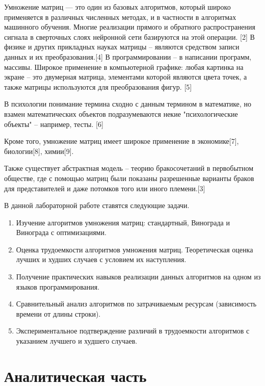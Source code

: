 \documentclass[a4paper,14pt]{article} %
\begin{document}
	Умножение матриц — это один из базовых алгоритмов, который широко применяется в различных численных методах, и в частности в алгоритмах машинного обучения. Многие реализации прямого и обратного распространения сигнала в сверточных слоях нейронной сети базируются на этой операции. [2] В физике и других прикладных науках матрицы – являются средством записи данных и их преобразования.[4] В программировании – в написании программ, массивы. Широкое применение в компьютерной графике: любая картинка на экране – это двумерная матрица, элементами которой являются цвета точек, а также матрицы используются для преобразования фигур. [5]
	
	В психологии понимание термина сходно с данным термином в математике, но взамен математических объектов подразумеваются некие "психологические объекты" – например, тесты. [6]
	
	Кроме того, умножение матриц имеет широкое применение в экономике[7], биологии[8], химии[9]. 
	
	Также существует абстрактная модель – теорию бракосочетаний в первобытном обществе, где с помощью матриц были показаны разрешенные варианты браков для представителей и даже потомков того или иного племени.[3]
	
	\hfill
	
	В данной лабораторной работе ставятся следующие задачи. 
        \begin{enumerate} 
		\item Изучение алгоритмов умножения матриц: стандартный, Винограда и Винограда с оптимизациями. 
		\item Оценка трудоемкости алгоритмов умножения матриц. Теоретическая оценка лучших и худших случаев с условием их наступления. 
		\item Получение практических навыков реализации данных алгоритмов на одном из языков программирования. 
		\item Сравнительный анализ алгоритмов по затрачиваемым ресурсам (зависимость времени от длины строки). 
		\item Экспериментальное подтверждение различий в трудоемкости алгоритмов с указанием лучшего и худшего случаев. 
	\end{enumerate}
	
	\newpage


        \section{Аналитическая часть}
        \hfill
        
\end{document}
